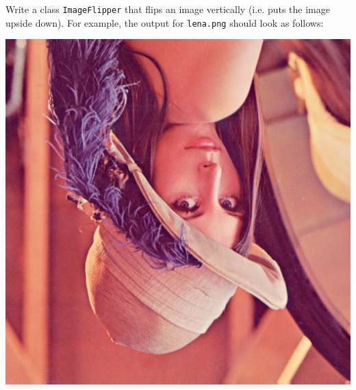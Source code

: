 \documentclass{book}
\begin{document}
\begin{exercise}\label{ex:flipper}
Write a class  \texttt{ImageFlipper} that flips an image vertically (i.e. puts the image upside down). For example, the output for \texttt{lena.png} should look as follows:
\begin{center}
\includegraphics[scale=0.2]{lena-flipped-hor.png}
\end{center}
\end{exercise}
\end{document}
